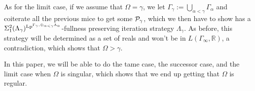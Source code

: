 \documentclass[../../main]{subfiles}
\begin{document}
\qquad As for the limit case, if we assume that $\Omega=\gamma$, we let $\Gamma_\gamma:=\bigcup_{\alpha<\gamma}\Gamma_\alpha$ and coiterate all the previous mice to get some $\P_\gamma$, which we then have to show has a $\Sigma^2_1(\Lambda_\gamma)^{\lp^{\Gamma_\gamma,\oplus_{\alpha<\gamma}\Lambda_\alpha}}$-fullness preserving iteration strategy $\Lambda_\gamma$. As before, this strategy will be determined as a set of reals and won't be in $L(\Gamma_\infty,\mathbb R)$, a contradiction, which shows that $\Omega>\gamma$.

\qquad In this paper, we will be able to do the tame case, the successor case, and the limit case when $\Omega$ is singular, which shows that we end up getting that $\Omega$ is regular.
\end{document}
